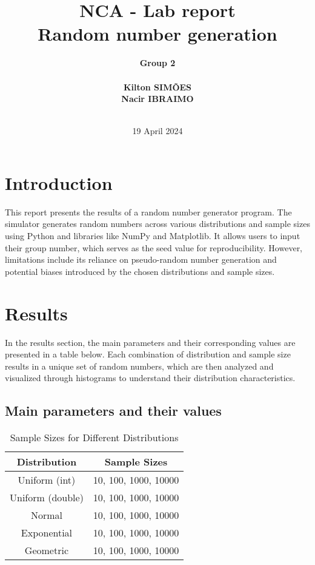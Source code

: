 \documentclass[12pt]{article}
\title{NCA - Lab report \\

Random number generation
}
\author{\bf{Group 2} \\ \\
        Kilton SIMÕES \\
        Nacir IBRAIMO  \\
         \\
}
\date{19 April 2024}
\begin{document}
\maketitle

\section{Introduction}

This report presents the results of a random number generator program.
The simulator generates random numbers across various distributions and sample sizes using Python and libraries like NumPy and Matplotlib. It allows users to input their group number, which serves as the seed value for reproducibility. However, limitations include its reliance on pseudo-random number generation and potential biases introduced by the chosen distributions and sample sizes.
\section{Results}

In the results section, the main parameters and their corresponding values are presented in a table below.
Each combination of distribution and sample size results in a unique set of random numbers, which are then analyzed and visualized through histograms to understand their distribution characteristics.

\subsection{Main parameters and their values}

\begin{table}[h!]
    \centering
    \begin{tabular}{|c|c|} \hline
        Distribution & Sample Sizes  \\ \hline
        Uniform (int) & 10, 100, 1000, 10000 \\ \hline
        Uniform (double) & 10, 100, 1000, 10000 \\ \hline
        Normal & 10, 100, 1000, 10000 \\ \hline
        Exponential & 10, 100, 1000, 10000 \\ \hline
        Geometric & 10, 100, 1000, 10000 \\ \hline
    \end{tabular}
    \caption{Sample Sizes for Different Distributions}
    \label{tab:my_label}
\end{table}
\end{document}
